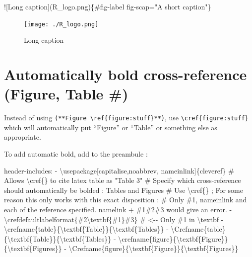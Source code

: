 \documentclass[
  letterpaper,
  DIV=11,
  numbers=noendperiod]{scrreprt}
\newenvironment{Shaded}{\begin{snugshade}}{\end{snugshade}}
\newcommand{\AlertTok}[1]{\textcolor[rgb]{0.68,0.00,0.00}{#1}}
\newcommand{\AttributeTok}[1]{\textcolor[rgb]{0.40,0.45,0.13}{#1}}
\newcommand{\CommentTok}[1]{\textcolor[rgb]{0.37,0.37,0.37}{#1}}
\newcommand{\FunctionTok}[1]{\textcolor[rgb]{0.28,0.35,0.67}{#1}}
\newcommand{\KeywordTok}[1]{\textcolor[rgb]{0.00,0.23,0.31}{#1}}
\newcommand{\NormalTok}[1]{\textcolor[rgb]{0.00,0.23,0.31}{#1}}
\begin{document}
\begin{Shaded}
\begin{Highlighting}[]
\AlertTok{![Long caption](R\_logo.png)}\NormalTok{\{\#fig{-}label fig{-}scap="A short caption"\}}
\end{Highlighting}
\end{Shaded}

\begin{figure}

{\centering \texttt{[image: ./R\_logo.png]}

}

\caption[A short caption]{\label{fig-label}Long caption}

\end{figure}

\listoffigures

\hypertarget{sec-bold-crossref}{%
\section{Automatically bold cross-reference (Figure, Table
\#)}\label{sec-bold-crossref}}

Instead of using
\texttt{(**Figure\ \textbackslash{}ref\{figure:stuff\}**)}, use
\texttt{\textbackslash{}cref\{figure:stuff\}} which will automatically
put ``Figure'' or ``Table'' or something else as appropriate.

To add automatic bold, add to the preambule :

\begin{Shaded}
\begin{Highlighting}[]
\FunctionTok{header{-}includes}\KeywordTok{:}
\KeywordTok{{-}}\AttributeTok{ \textbackslash{}usepackage[capitalise,noabbrev, nameinlink]\{cleveref\}}\CommentTok{ \# Allows \textbackslash{}cref\{\} to cite latex table as "Table 3"}
\CommentTok{\# Specify which cross{-}reference should automatically be bolded : Tables and Figures}
\CommentTok{\# Use \textbackslash{}cref\{\} ; For some reason this only works with this exact disposition :}
\CommentTok{\# Only \#1, nameinlink and each of the reference specified. namelink + \#1\#2\#3 would give an error.}
\KeywordTok{{-}}\AttributeTok{ \textbackslash{}crefdefaultlabelformat\{}\CommentTok{\#2\textbackslash{}textbf\{\#1\}\#3\} \# \textless{}{-}{-} Only \#1 in \textbackslash{}textbf}
\KeywordTok{{-}}\AttributeTok{ \textbackslash{}crefname\{table\}\{\textbackslash{}textbf\{Table\}\}\{\textbackslash{}textbf\{Tables\}\}}
\KeywordTok{{-}}\AttributeTok{ \textbackslash{}Crefname\{table\}\{\textbackslash{}textbf\{Table\}\}\{\textbackslash{}textbf\{Tables\}\}}
\KeywordTok{{-}}\AttributeTok{ \textbackslash{}crefname\{figure\}\{\textbackslash{}textbf\{Figure\}\}\{\textbackslash{}textbf\{Figures\}\} }
\KeywordTok{{-}}\AttributeTok{ \textbackslash{}Crefname\{figure\}\{\textbackslash{}textbf\{Figure\}\}\{\textbackslash{}textbf\{Figures\}\}}
\end{Highlighting}
\end{Shaded}
\end{document}
